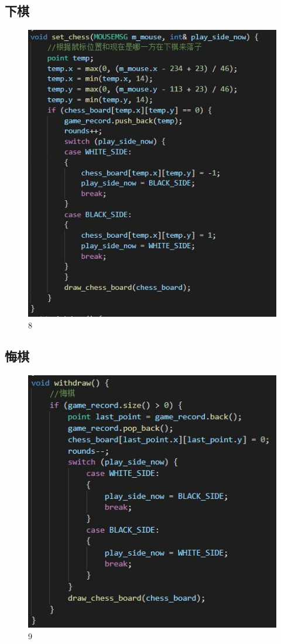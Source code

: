 \documentclass[UTF8]{ctexart}
\begin{document}
\subsection{下棋}
\begin{figure}[H]
    \centering
    \includegraphics[scale=1.0]{7.jpg}
\caption{8}
\end{figure}
\subsection{悔棋}
\begin{figure}[H]
    \centering
    \includegraphics[scale=1.0]{8.jpg}
\caption{9}
\end{figure}
\end{document}
